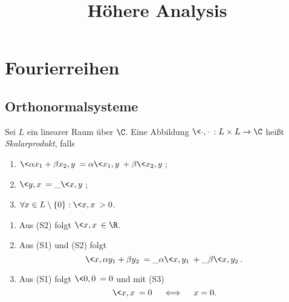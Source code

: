 \documentclass{mycourse}
\title{Höhere Analysis}
\begin{document}
\maketitle
\tableofcontents

\chapter{Fourierreihen}

\section{Orthonormalsysteme}

\begin{df} \label{1.1}
	Sei $L$ ein linearer Raum über $\C$.
	Eine Abbildung $\<\cdot, \cdot\>: L \times L \to \C$ heißt \emph{Skalarprodukt}, falls
	\begin{enumerate}[(S1)]
		\item
			$\<\alpha x_1 + \beta x_2, y \> = \alpha \<x_1,y\> + \beta \<x_2, y\>$;
		\item
			$\<y,x\> = \_{\<x,y\>}$;
		\item
			$\forall x\in L\setminus \{0\} : \<x,x\> > 0$.
	\end{enumerate}
\end{df}

\begin{nt} \label{1.2}
	\begin{enumerate}[1)]
		\item
			Aus (S2) folgt $\<x,x\> \in \R$.
		\item
			Aus (S1) und (S2) folgt
			\[
				\<x, \alpha y_1 + \beta y_2\> = \_\alpha \<x,y_1\> + \_\beta \<x,y_2\>.
			\]
		\item
			Aus (S1) folgt $\<0,0\> = 0$ und mit (S3)
			\[
				\<x,x\> = 0 \quad\iff\quad x=0.
			\]
	\end{enumerate}
\end{nt}
\end{document}
